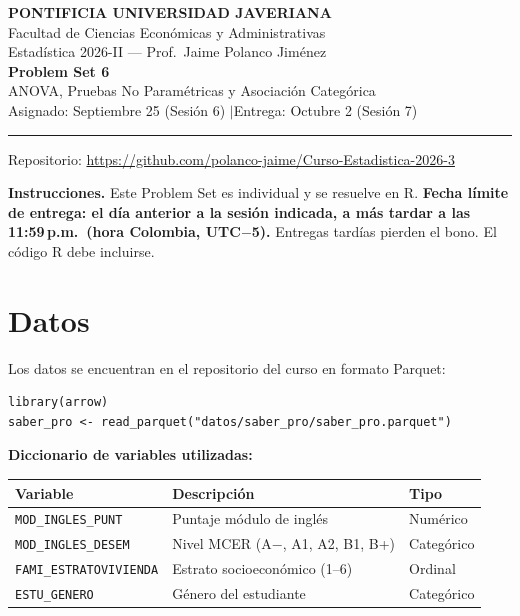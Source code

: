 \documentclass[11pt, a4paper]{article}
\begin{document}
\begin{center}
{\large\bfseries PONTIFICIA UNIVERSIDAD JAVERIANA}\\[3pt]
Facultad de Ciencias Econ\'omicas y Administrativas\\[2pt]
Estad\'istica 2026-II --- Prof.\ Jaime Polanco Jim\'enez\\[6pt]
{\LARGE\bfseries Problem Set 6}\\[3pt]
{\large ANOVA, Pruebas No Param\'etricas y Asociaci\'on Categ\'orica}\\[6pt]
Asignado: Septiembre 25 (Sesi\'on 6) \quad$|$\quad Entrega: Octubre 2 (Sesi\'on 7)
\end{center}

\vspace{6pt}
\rule{\linewidth}{0.5pt}
\vspace{2pt}
{\centering\small Repositorio: \url{https://github.com/polanco-jaime/Curso-Estadistica-2026-3}\par}
\vspace{6pt}

\textbf{Instrucciones.} Este Problem Set es individual y se resuelve en R.
\textbf{Fecha l\'imite de entrega: el d\'ia anterior a la sesi\'on indicada, a m\'as tardar a las 11:59\,p.m.\ (hora Colombia, UTC$-$5).} Entregas tard\'ias pierden el bono. El c\'odigo R debe incluirse.

\section*{Datos}

Los datos se encuentran en el repositorio del curso en formato Parquet:

\begin{lstlisting}
library(arrow)
saber_pro <- read_parquet("datos/saber_pro/saber_pro.parquet")
\end{lstlisting}

\textbf{Diccionario de variables utilizadas:}

\vspace{4pt}
\begin{tabular}{l l l}
\toprule
\textbf{Variable} & \textbf{Descripci\'on} & \textbf{Tipo} \\
\midrule
\texttt{MOD\_INGLES\_PUNT}       & Puntaje m\'odulo de ingl\'es         & Num\'erico \\
\texttt{MOD\_INGLES\_DESEM}      & Nivel MCER (A$-$, A1, A2, B1, B+)  & Categ\'orico \\
\texttt{FAMI\_ESTRATOVIVIENDA}   & Estrato socioecon\'omico (1--6)     & Ordinal \\
\texttt{ESTU\_GENERO}            & G\'enero del estudiante              & Categ\'orico \\
\bottomrule
\end{tabular}
\end{document}
